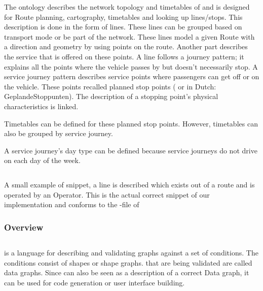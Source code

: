 The ontology describes the network topology and timetables of  and is designed for Route planning, cartography, timetables and looking up lines/stops. This description is done in the form of lines. These lines can be grouped based on transport mode or be part of the network. These lines model a given Route with a direction and geometry by using points on the route. Another part describes the service that is offered on these points. A line follows a journey pattern; it explains all the points where the vehicle passes by but doesn’t necessarily stop. A service journey pattern describes service points where passengers can get off or on the vehicle. These points recalled planned stop points ( or in Dutch: GeplandeStoppunten). The description of a stopping point’s physical characteristics is linked. 

Timetables can be defined for these planned stop points. However, timetables can also be grouped by service journey.

A service journey’s day type can be defined because service journeys do not drive on each day of the week. 

\begin{listing}[H]
\inputminted[linenos,frame=single,breaklines]{jsonld}{code/oslo_example_line.jsonld}
\caption{A small example of  snippet, a line is described which exists out of a route and is operated by an Operator. This is the actual correct snippet of our implementation and conforms to the -file of }
\label{code:
example:line}
\end{listing}


\begin{landscape}
\subsubsection{Overview}

\end{landscape}


\subsection{}
\cite{noauthor_shapes_2017-1} is a language for describing and validating  graphs against a set of conditions. The conditions consist of shapes or shape graphs.  that are being validated are called data graphs. Since  can also be seen as a description of a correct Data graph, it can be used for code generation or user interface building.

